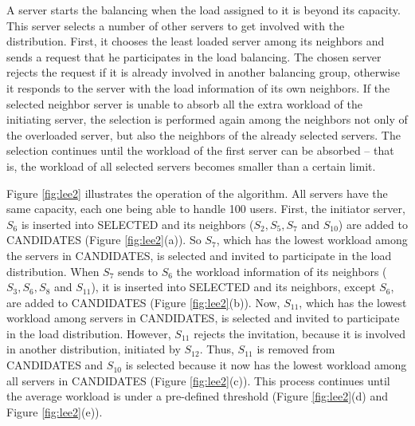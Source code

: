 A server starts the balancing when the load assigned to it is beyond its capacity. This server selects a number of other servers to get involved with the distribution. First, it chooses the least loaded server among its neighbors and sends a request that he participates in the load balancing. The chosen server rejects the request if it is already involved in another balancing group, otherwise it responds to the server with the load information of its own neighbors. If the selected neighbor server is unable to absorb all the extra workload of the initiating server, the selection is performed again among the neighbors not only of the overloaded server, but also the neighbors of the already selected servers. The selection continues until the workload of the first server can be absorbed -- that is, the workload of all selected servers becomes smaller than a certain limit.

Figure \ref{fig:lee2} illustrates the operation of the algorithm. All servers have the same capacity, each one being able to handle 100 users. First, the initiator server, $S_6$ is inserted into SELECTED and its neighbors ($S_2, S_5, S_7$ and $S_{10}$) are added to CANDIDATES (Figure \ref{fig:lee2}(a)). So $S_7$, which has the lowest workload among the servers in CANDIDATES, is selected and invited to participate in the load distribution. When $S_7$ sends to $S_6$ the workload information of its neighbors ($S_3, S_6, S_8$ and $S_{11}$), it is inserted into SELECTED and its neighbors, except $S_6$, are added to CANDIDATES (Figure \ref{fig:lee2}(b)). Now, $S_{11}$, which has the lowest workload among servers in CANDIDATES, is selected and invited to participate in the load distribution. However, $S_{11}$ rejects the invitation, because it is involved in another distribution, initiated by $S_{12}$. Thus, $S_{11}$ is removed from CANDIDATES and $S_{10}$ is selected because it now has the lowest workload among all servers in CANDIDATES (Figure \ref{fig:lee2}(c)). This process continues until the average workload is under a pre-defined threshold (Figure \ref{fig:lee2}(d) and Figure \ref{fig:lee2}(e)).

